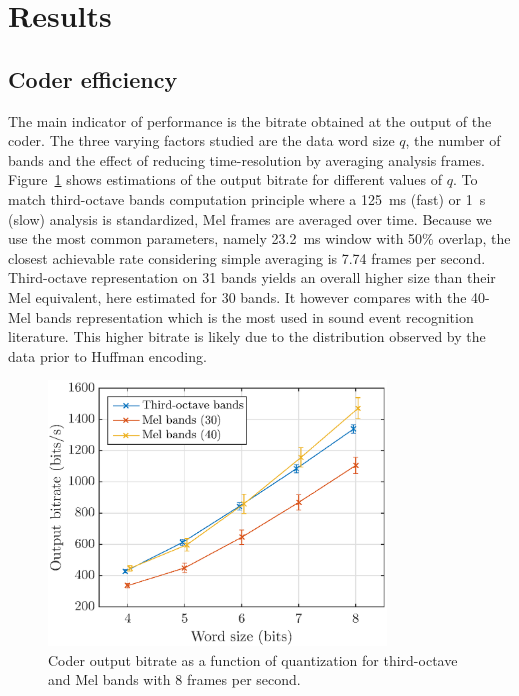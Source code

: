 \documentclass[sensors,article,submit,moreauthors,pdftex,10pt,a4paper]{mdpi}
\begin{document}
\section{Results} \label{sec:results}

\subsection{Coder efficiency} \label{sec:efficiency_r}

The main indicator of performance is the bitrate obtained at the output of the coder. The three varying factors studied are the data word size $q$, the number of bands and the effect of reducing time-resolution by averaging analysis frames. Figure~\ref{fig:bitrate_q} shows estimations of the output bitrate for different values of $q$. To match third-octave bands computation principle where a 125~ms (fast) or 1~s (slow) analysis is standardized, Mel frames are averaged over time. Because we use the most common parameters, namely 23.2~ms window with 50\% overlap, the closest achievable rate considering simple averaging is 7.74 frames per second. Third-octave representation on 31 bands yields an overall higher size than their Mel equivalent, here estimated for 30 bands. It however compares with the 40-Mel bands representation which is the most used in sound event recognition literature. This higher bitrate is likely due to the distribution observed by the data prior to Huffman encoding.

\begin{figure}[htbp]
	\centering
		\includegraphics[width=0.8\textwidth]{figures/bitrate_qall.eps}
	\caption{Coder output bitrate as a function of quantization for third-octave and Mel bands with 8 frames per second.}
	\label{fig:bitrate_q}
\end{figure}
\end{document}
